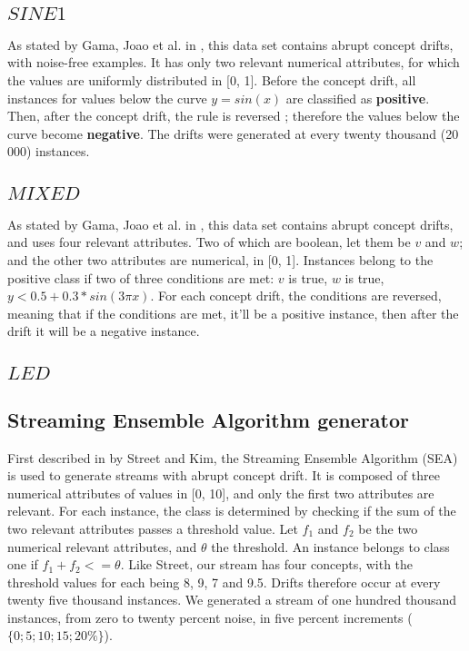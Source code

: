 \subsection{$SINE1$}
As stated by Gama, Joao et al. in \cite{gama2004learning}, this data set contains abrupt concept drifts, with noise-free examples. It has only two relevant numerical attributes, for which the values are uniformly distributed in [0, 1]. Before the concept drift, all instances for values below the curve $y = sin(x)$ are classified as \textbf{positive}. Then, after the concept drift, the rule is reversed ; therefore the values below the curve become \textbf{negative}. The drifts were generated at every twenty thousand (20 000) instances.

\subsection{$MIXED$}
As stated by Gama, Joao et al. in \cite{gama2004learning}, this data set contains abrupt concept drifts, and uses four relevant attributes. Two of which are boolean, let them be $v$ and $w$; and the other two attributes are numerical, in [0, 1]. Instances belong to the positive class if two of three conditions are met: $v$ is true, $w$ is true, $y < 0.5 + 0.3 * sin(3\pi x)$. For each concept drift, the conditions are reversed, meaning that if the conditions are met, it'll be a positive instance, then after the drift it will be a negative instance.

\subsection{$LED$}
\subsection{Streaming Ensemble Algorithm generator}
First described in \cite{street2001streaming} by Street and Kim, the Streaming Ensemble Algorithm (SEA) is used to generate streams with abrupt concept drift. It is composed of three numerical attributes of values in [0, 10], and only the first two attributes are relevant. For each instance, the class is determined by checking if the sum of the two relevant attributes passes a threshold value. Let $f_1$ and $f_2$ be the two numerical relevant attributes, and $\theta$ the threshold. An instance belongs to class one if $f_1 + f_2 <= \theta$. Like Street, our stream has four concepts, with the threshold values for each being 8, 9, 7 and 9.5. Drifts therefore occur at every twenty five thousand instances. We generated a stream of one hundred thousand instances, from zero to twenty percent noise, in five percent increments ($\{0; 5; 10; 15; 20\%\}$).

